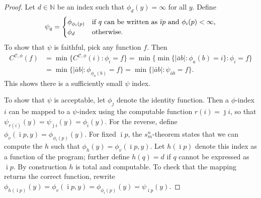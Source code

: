\documentclass{style/llncs}
\newcommand{\C}{\mathscr C}
\newcommand{\N}{\mathbb N}
\newcommand{\tn}[1]{\textnormal{#1}}
\begin{document}
\begin{proof}
Let $d \in \N$ be an index such that $\phi_d(y)=\infty$ for all $y$. Define
  \[\psi_q=\begin{cases}
    \phi_{\phi_i(p)}&\tn{if $q$ can be written as $\bar\imath p$ and $\phi_i(p)<\infty$,}\\
    \phi_d&\tn{otherwise.}\end{cases}
  \]
  To show that $\psi$ is faithful, pick any function $f$. Then
\[\begin{split}
C^{\C, \phi}(f)&=\min\{C^{\C, \phi}(i):\phi_i=f\} =\min\{\min\{|\bar a b|:\phi_a(b)=i\}:\phi_i=f\} \\
& =\min\{|\bar a b|:\phi_{\phi_a(b)}=f\}
 =\min\{|\bar a b|:\psi_{\bar a b}=f\}.
\end{split}\]
This shows there is a sufficiently small $\psi$ index.

To show that $\psi$ is acceptable, let $\phi_j$ denote the identity
function. Then a $\phi$-index $i$ can be mapped to a $\psi$-index
using the computable function $r(i)=\bar\jmath i$, so that
$\psi_{r(i)}(y)=\psi_{\bar\jmath i}(y)=\phi_i(y)$. For the reverse,
define $\phi_v(\bar\imath p, y)=\phi_{\phi_i(p)}(y)$. For fixed
$\bar\imath p$, the 
$s^n_m$-theorem \cite{kleene193notation} states that we can compute the $h$
such that $\phi_h(y)=\phi_v(\bar\imath p,y)$. Let $h(\bar\imath p)$
denote this index as a function of the program; further define
$h(q)=d$ if $q$ cannot be expressed as $\bar\imath p$. By
construction $h$ is total and computable. To check that the mapping
returns the correct function, rewrite $\phi_{h(\bar\imath
  p)}(y)=\phi_v(\bar\imath p,y)=\phi_{\phi_i(p)}(y)=\psi_{\bar\imath p}(y)$.
\end{proof}
\end{document}
